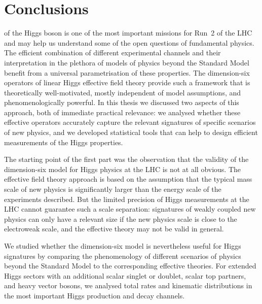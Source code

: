 
 
\chapter{Conclusions}
\label{chapter:conclusions}

 of the Higgs boson is one of
the most important missions for Run~2 of the LHC and may help us
understand some of the open questions of fundamental physics. The
efficient combination of different experimental channels and their
interpretation in the plethora of models of physics beyond the
Standard Model benefit from a universal parametrisation of these
properties. The dimension-six operators of linear Higgs effective
field theory provide such a framework that is theoretically
well-motivated, mostly independent of model assumptions, and
phenomenologically powerful. In this thesis we discussed two aspects
of this approach, both of immediate practical relevance: we analysed
whether these effective operators accurately capture the relevant
signatures of specific scenarios of new physics, and we developed
statistical tools that can help to design efficient measurements of
the Higgs properties.

\newparagraph
%
The starting point of the first part was the observation that the
validity of the dimension-six model for Higgs physics at the LHC is
not at all obvious. The effective field theory approach is based on
the assumption that the typical mass scale of new physics is
significantly larger than the energy scale of the experiments
described. But the limited precision of Higgs measurements at the LHC
cannot guarantee such a scale separation: signatures of weakly coupled
new physics can only have a relevant size if the new physics scale is
close to the electroweak scale, and the effective theory may not be
valid in general.

We studied whether the dimension-six model is nevertheless useful for
Higgs signatures
by comparing the phenomenology of different scenarios of physics
beyond the Standard Model to the corresponding effective theories. For
extended Higgs sectors with an additional scalar singlet or doublet,
scalar top partners, and heavy vector bosons, we analysed total rates
and kinematic distributions in the most important Higgs production and
decay channels.

